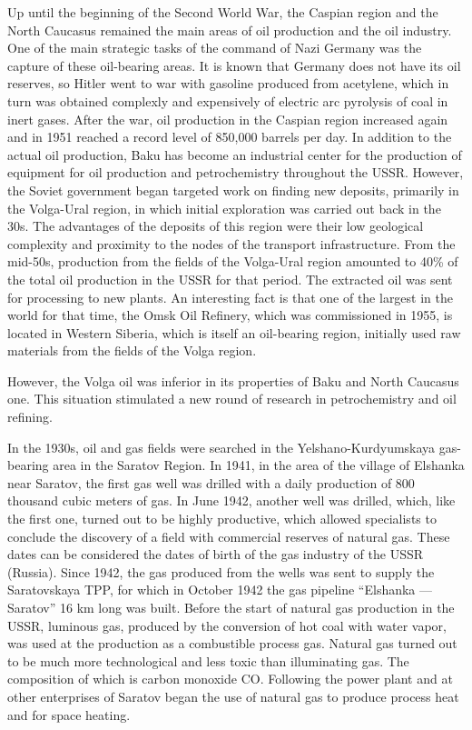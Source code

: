 \documentclass[12pt]{report}
\theoremstyle{definition}
\begin{document}
Up until the beginning of the Second World War, the Caspian region and the North Caucasus remained the main areas of oil production and the oil industry.
One of the main strategic tasks of the command of Nazi Germany was the capture of these oil-bearing areas.
It is known that Germany does not have its oil reserves, so Hitler went to war with gasoline produced from acetylene, which in turn was obtained complexly and expensively of electric arc pyrolysis of coal in inert gases.
After the war, oil production in the Caspian region increased again and in 1951 reached a record level of 850,000 barrels per day.
In addition to the actual oil production, Baku has become an industrial center for the production of equipment for oil production and petrochemistry throughout the USSR.
However, the Soviet government began targeted work on finding new deposits, primarily in the Volga-Ural region, in which initial exploration was carried out back in the 30s.
The advantages of the deposits of this region were their low geological complexity and proximity to the nodes of the transport infrastructure.
From the mid-50s, production from the fields of the Volga-Ural region amounted to 40\% of the total oil production in the USSR for that period.
The extracted oil was sent for processing to new plants.
An interesting fact is that one of the largest in the world for that time, the Omsk Oil Refinery, which was commissioned in 1955, is located in Western Siberia, which is itself an oil-bearing region, initially used raw materials from the fields of the Volga region.

However, the Volga oil was inferior in its properties of Baku and North Caucasus one.
This situation stimulated a new round of research in petrochemistry and oil refining.

In the 1930s, oil and gas fields were searched in the Yelshano-Kurdyumskaya gas-bearing area in the Saratov Region.
In 1941, in the area of the village of Elshanka near Saratov, the first gas well was drilled with a daily production of 800 thousand cubic meters of gas.
In June 1942, another well was drilled, which, like the first one, turned out to be highly productive, which allowed specialists to conclude the discovery of a field with commercial reserves of natural gas.
These dates can be considered the dates of birth of the gas industry of the USSR (Russia).
Since 1942, the gas produced from the wells was sent to supply the Saratovskaya TPP, for which in October 1942 the gas pipeline ``Elshanka --- Saratov'' 16 km long was built.
Before the start of natural gas production in the USSR, luminous gas, produced by the conversion of hot coal with water vapor, was used at the production as a combustible process gas.
Natural gas turned out to be much more technological and less toxic than illuminating gas.
The composition of which is carbon monoxide CO.
Following the power plant and at other enterprises of Saratov began the use of natural gas to produce process heat and for space heating.
\end{document}
